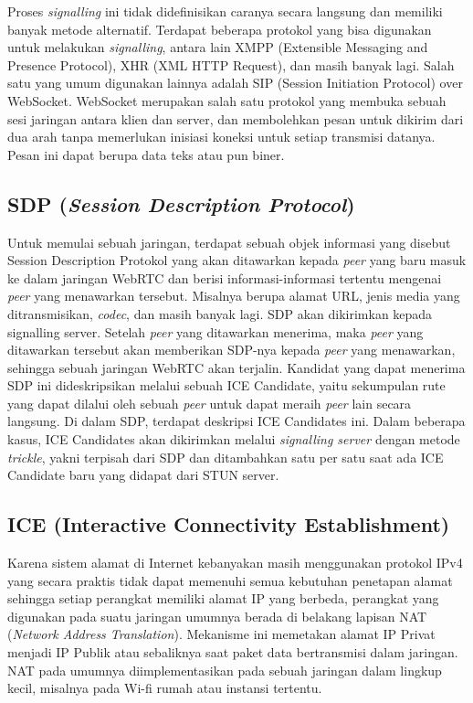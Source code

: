 Proses \textit{signalling} ini tidak didefinisikan caranya secara langsung dan memiliki banyak metode alternatif. Terdapat beberapa protokol yang bisa digunakan untuk melakukan \textit{signalling}, antara lain XMPP (Extensible Messaging and Presence Protocol), XHR (XML HTTP Request), dan masih banyak lagi. Salah satu yang umum digunakan lainnya adalah SIP (Session Initiation Protocol) over WebSocket. WebSocket merupakan salah satu protokol yang membuka sebuah sesi jaringan antara klien dan server, dan membolehkan pesan untuk dikirim dari dua arah tanpa memerlukan inisiasi koneksi untuk setiap transmisi datanya. Pesan ini dapat berupa data teks atau pun biner.

\subsection{SDP (\textit{Session Description Protocol})}

Untuk memulai sebuah jaringan, terdapat sebuah objek informasi yang disebut Session Description Protokol yang akan ditawarkan kepada \textit{peer} yang baru masuk ke dalam jaringan WebRTC dan berisi informasi-informasi tertentu mengenai \textit{peer} yang menawarkan tersebut. Misalnya berupa alamat URL, jenis media yang ditransmisikan, \textit{codec}, dan masih banyak lagi. SDP akan dikirimkan kepada signalling server. Setelah \textit{peer} yang ditawarkan menerima, maka \textit{peer} yang ditawarkan tersebut akan memberikan SDP-nya kepada \textit{peer} yang menawarkan, sehingga sebuah jaringan WebRTC akan terjalin. Kandidat yang dapat menerima SDP ini dideskripsikan melalui sebuah ICE Candidate, yaitu sekumpulan rute yang dapat dilalui oleh sebuah \textit{peer} untuk dapat meraih \textit{peer} lain secara langsung. Di dalam SDP, terdapat deskripsi ICE Candidates ini. Dalam beberapa kasus, ICE Candidates akan dikirimkan melalui \textit{signalling server} dengan metode \textit{trickle}, yakni terpisah dari SDP dan ditambahkan satu per satu saat ada ICE Candidate baru yang didapat dari STUN server.

\subsection{ICE (Interactive Connectivity Establishment)}

Karena sistem alamat di Internet kebanyakan masih menggunakan protokol IPv4 yang secara praktis tidak dapat memenuhi semua kebutuhan penetapan alamat sehingga setiap perangkat memiliki alamat IP yang berbeda, perangkat yang digunakan pada suatu jaringan umumnya berada di belakang lapisan NAT (\textit{Network Address Translation}). Mekanisme ini memetakan alamat IP Privat menjadi IP Publik atau sebaliknya saat paket data bertransmisi dalam jaringan. NAT pada umumnya diimplementasikan pada sebuah jaringan dalam lingkup kecil, misalnya pada Wi-fi rumah atau instansi tertentu.

